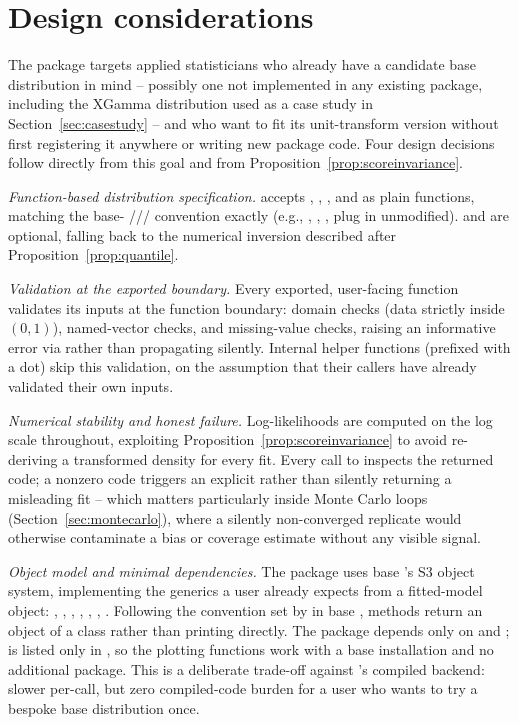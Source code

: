\documentclass[article]{jss}
\begin{document}
\section{Design considerations}
\label{sec:design}

The package targets applied statisticians who already have a candidate base distribution in mind -- possibly one not implemented in any existing package, including the XGamma distribution used as a case study in Section~\ref{sec:casestudy} -- and who want to fit its unit-transform version without first registering it anywhere or writing new package code. Four design decisions follow directly from this goal and from Proposition~\ref{prop:scoreinvariance}.

\emph{Function-based distribution specification.}  accepts , , , and  as plain  functions, matching the base- /// convention exactly (e.g., , , ,  plug in unmodified).  and  are optional, falling back to the numerical inversion described after Proposition~\ref{prop:quantile}.

\emph{Validation at the exported boundary.} Every exported, user-facing function validates its inputs at the function boundary: domain checks (data strictly inside $(0,1)$), named-vector checks, and missing-value checks, raising an informative error via  rather than propagating  silently. Internal helper functions (prefixed with a dot) skip this validation, on the assumption that their callers have already validated their own inputs.

\emph{Numerical stability and honest failure.} Log-likelihoods are computed on the log scale throughout, exploiting Proposition~\ref{prop:scoreinvariance} to avoid re-deriving a transformed density for every fit. Every call to  inspects the returned  code; a nonzero code triggers an explicit  rather than silently returning a misleading fit -- which matters particularly inside Monte Carlo loops (Section~\ref{sec:montecarlo}), where a silently non-converged replicate would otherwise contaminate a bias or coverage estimate without any visible signal.

\emph{Object model and minimal dependencies.} The package uses base 's S3 object system, implementing the generics a user already expects from a fitted-model object: , , , , , , . Following the convention set by  in base ,  methods return an object of a  class rather than printing directly. The package depends only on  and ;  is listed only in , so the plotting functions work with a base  installation and no additional package. This is a deliberate trade-off against 's compiled  backend: slower per-call, but zero compiled-code burden for a user who wants to try a bespoke base distribution once.
\end{document}
